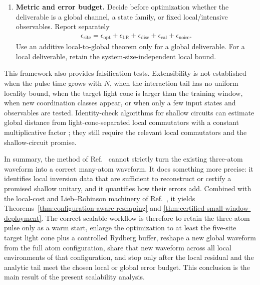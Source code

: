 \begin{enumerate}
the Duhamel radius in Eq.~\eqref{eq:configuration-cluster-radius}.
\item \textbf{Metric and error budget.}  Decide before optimization whether
the deliverable is a global channel, a state family, or fixed local/intensive
observables.  Report separately
\begin{align}
\epsilon_{\mathrm{site}}
=\epsilon_{\mathrm{opt}}+\epsilon_{\mathrm{LR}}
+\epsilon_{\mathrm{disc}}+\epsilon_{\mathrm{cal}}+\epsilon_{\mathrm{noise}}.
\label{eq:general-local-error-budget}
\end{align}
Use an additive local-to-global theorem only for a global deliverable.  For a
local deliverable, retain the system-size-independent local bound.
\end{enumerate}

This framework also provides falsification tests.  Extensibility is not
established when the pulse time grows with $N$, when the interaction tail has
no uniform locality bound, when the target light cone is larger than the
training window, when new coordination classes appear, or when only a few
input states and observables are tested.  Identity-check algorithms for
shallow circuits can estimate global distance from light-cone-separated local
commutators with a constant multiplicative factor
\cite{bravyi_2026_identity}; they still require the relevant local
commutators and the shallow-circuit promise.

In summary, the method of Ref.~\cite{huang_2024_learning} cannot strictly turn
the existing three-atom waveform into a correct many-atom waveform.  It does
something more precise: it identifies local inversion data that are sufficient
to reconstruct or certify a promised shallow unitary, and it quantifies how
their errors add.  Combined with the local-cost and Lieb--Robinson machinery
of Ref.~\cite{mizuta_2022_local}, it yields
Theorems~\ref{thm:configuration-aware-reshaping} and
\ref{thm:certified-small-window-deployment}.  The correct scalable workflow is
therefore to retain the three-atom pulse only as a warm start, enlarge the
optimization to at least the five-site target light cone plus a controlled
Rydberg buffer, reshape a new global waveform from the full atom
configuration, share that new waveform across all local environments of that
configuration, and stop only after the local residual and the analytic tail
meet the chosen local or global error budget.  This conclusion is the main
result of the present scalability analysis.
